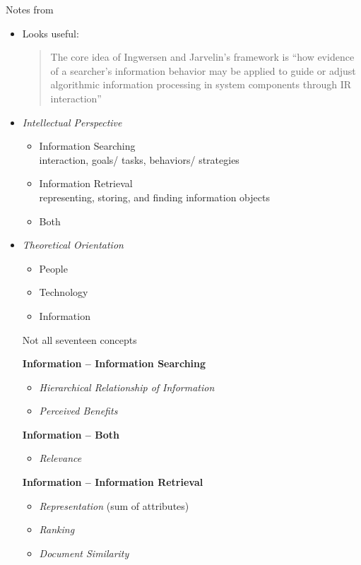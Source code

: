 \documentclass{article}
\begin{document}
Notes from \cite{jansen09}

\begin{itemize}

\item Looks useful:
    \begin{quote}
    The core idea of Ingwersen and Jarvelin's framework is ``how evidence of a searcher's information behavior may be applied to guide or adjust algorithmic information processing in system components through IR interaction''
    \end{quote}

\item {\it Intellectual Perspective}
    \begin{itemize}
        \item Information Searching \\
            {\footnotesize
                interaction, goals/ tasks, behaviors/ strategies}
        \item Information Retrieval \\
            {\footnotesize
                representing, storing, and finding information objects}
        \item Both
    \end{itemize}

\item {\it Theoretical Orientation}
    \begin{itemize}
        \item People
        \item Technology
        \item Information
    \end{itemize}

    Not all seventeen concepts

    {\bf Information -- Information Searching}
    \begin{itemize}
        \item {\it Hierarchical Relationship of Information} 
        \item {\it Perceived Benefits}
    \end{itemize}

    {\bf Information -- Both}
    \begin{itemize}
        \item {\it Relevance}
    \end{itemize}

    {\bf Information -- Information Retrieval}
    \begin{itemize}
        \item {\it Representation} (sum of attributes)
        \item {\it Ranking}
        \item {\it Document Similarity}
    \end{itemize}


\end{itemize}
\end{document}
